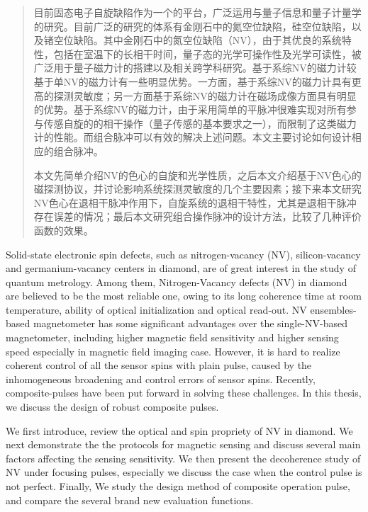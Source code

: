 
\begin{abstract}
    目前固态电子自旋缺陷作为一个的平台，广泛运用与量子信息和量子计量学的研究。目前广泛的研究的体系有金刚石中的氮空位缺陷，硅空位缺陷，以及锗空位缺陷。其中金刚石中的氮空位缺陷（NV），由于其优良的系统特性，包括在室温下的长相干时间，量子态的光学可操作性及光学可读性，被广泛用于量子磁力计的搭建以及相关跨学科研究。基于系综NV的磁力计较基于单NV的磁力计有一些明显优势。一方面，基于系综NV的磁力计具有更高的探测灵敏度；另一方面基于系综NV的磁力计在磁场成像方面具有明显的优势。基于系综NV的磁力计，由于采用简单的平脉冲很难实现对所有参与传感自旋的的相干操作（量子传感的基本要求之一），而限制了这类磁力计的性能。而组合脉冲可以有效的解决上述问题。本文主要讨论如何设计相应的组合脉冲。
    
    
    本文先简单介绍NV的色心的自旋和光学性质，之后本文介绍基于NV色心的磁探测协议，并讨论影响系统探测灵敏度的几个主要因素；接下来本文研究NV色心在退相干脉冲作用下，自旋系统的退相干特性，尤其是退相干脉冲存在误差的情况；最后本文研究组合操作脉冲的设计方法，比较了几种评价函数的效果。
    
\end{abstract}

\begin{enabstract}
  Solid-state electronic spin defects, such as nitrogen-vacancy (NV), silicon-vacancy and germanium-vacancy centers in diamond, are of great interest in the study of quantum metrology. Among them, Nitrogen-Vacancy defects (NV) in diamond are believed to be the most reliable one, owing to its long coherence time at room temperature, ability of optical initialization and optical read-out. NV ensembles-based magnetometer has some significant advantages over the single-NV-based magnetometer, including higher magnetic field sensitivity and higher sensing speed especially in magnetic field imaging case.  However, it is hard to realize coherent control of all the sensor spins with plain pulse, caused by the inhomogeneous broadening and control errors of sensor spins.  Recently, composite-pulses have been put forward in solving these challenges. In this thesis, we discuss the design of robust composite pulses.
  
  We first introduce, review the optical and spin propriety of NV in diamond. We next demonstrate the the protocols for magnetic sensing and discuss  several main factors affecting the sensing sensitivity. We then present the decoherence study of NV under focusing pulses, especially we discuss the case when the control pulse is not perfect. Finally, We study the design method of composite operation pulse, and compare the several brand new evaluation functions.

 
\end{enabstract}
